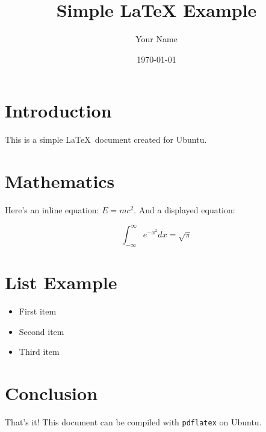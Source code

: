 \documentclass{article}
\title{Simple LaTeX Example}
\author{Your Name}
\date{\today}
\begin{document}
\maketitle %

\section{Introduction}

This is a simple \LaTeX\ document created for Ubuntu. 

\section{Mathematics}

Here's an inline equation: $E = mc^2$. And a displayed equation:

\[
\int_{-\infty}^{\infty} e^{-x^2} dx = \sqrt{\pi}
\]

\section{List Example}

\begin{itemize}
    \item First item
    \item Second item
    \item Third item
\end{itemize}

\section{Conclusion}

That's it! This document can be compiled with \texttt{pdflatex} on Ubuntu.
\end{document}
